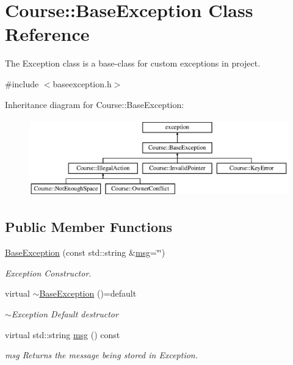 \hypertarget{classCourse_1_1BaseException}{\section{Course\-:\-:Base\-Exception Class Reference}
\label{classCourse_1_1BaseException}
}


The Exception class is a base-\/class for custom exceptions in project.  




{\ttfamily \#include $<$baseexception.\-h$>$}

Inheritance diagram for Course\-:\-:Base\-Exception\-:\begin{figure}[H]
\begin{center}
\leavevmode
\includegraphics[height=3.393939cm]{classCourse_1_1BaseException}
\end{center}
\end{figure}
\subsection*{Public Member Functions}
\begin{DoxyCompactItemize}
\item 
\hyperlink{classCourse_1_1BaseException_a1d853799191742f9b262fadd69d21b09}{Base\-Exception} (const std\-::string \&\hyperlink{classCourse_1_1BaseException_ac5a744a6af6f2ba9198b58e52bb62f5a}{msg}=\char`\"{}\char`\"{})
\begin{DoxyCompactList}\small\item\em Exception Constructor. \end{DoxyCompactList}\item 
virtual \hyperlink{classCourse_1_1BaseException_a23f96d764abe5a28039bb82a655a484c}{$\sim$\-Base\-Exception} ()=default
\begin{DoxyCompactList}\small\item\em $\sim$\-Exception Default destructor \end{DoxyCompactList}\item 
virtual std\-::string \hyperlink{classCourse_1_1BaseException_ac5a744a6af6f2ba9198b58e52bb62f5a}{msg} () const 
\begin{DoxyCompactList}\small\item\em msg Returns the message being stored in Exception. \end{DoxyCompactList}\end{DoxyCompactItemize}

